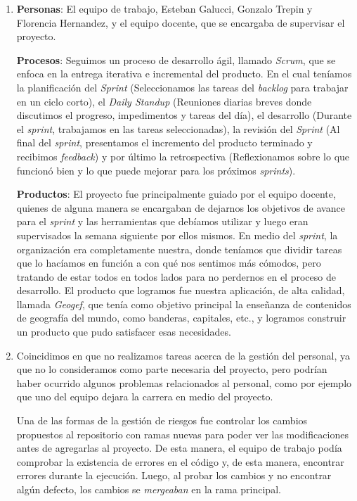 \documentclass{article}
\begin{document}
\begin{enumerate}
    \item
    \textbf{Personas}: El equipo de trabajo, Esteban Galucci, Gonzalo Trepin y Florencia Hernandez, y el equipo docente, que se encargaba de supervisar el proyecto.

    \textbf{Procesos}: Seguimos un proceso de desarrollo ágil, llamado \textit{Scrum}, que se enfoca en la entrega iterativa e incremental del producto. En el cual teníamos la planificación del \textit{Sprint} (Seleccionamos las tareas del \textit{backlog} para trabajar en un ciclo corto), el \textit{Daily Standup} (Reuniones diarias breves donde discutimos el progreso, impedimentos y tareas del día), el desarrollo (Durante el \textit{sprint}, trabajamos en las tareas seleccionadas), la revisión del \textit{Sprint} (Al final del \textit{sprint}, presentamos el incremento del producto terminado y recibimos \textit{feedback}) y por último la retrospectiva (Reflexionamos sobre lo que funcionó bien y lo que puede mejorar para los próximos \textit{sprints}).

    \textbf{Productos}: El proyecto fue principalmente guiado por el equipo docente, quienes de alguna manera se encargaban de dejarnos los objetivos de avance para el \textit{sprint} y las herramientas que debíamos utilizar y luego eran supervisados la semana siguiente por ellos mismos. En medio del \textit{sprint}, la organización era completamente nuestra, donde teníamos que dividir tareas que lo hacíamos en función a con qué nos sentimos más cómodos, pero tratando de estar todos en todos lados para no perdernos en el proceso de desarrollo. El producto que logramos fue nuestra aplicación, de alta calidad, llamada \textit{Geogef}, que tenía como objetivo principal la enseñanza de contenidos de geografía del mundo, como banderas, capitales, etc., y logramos construir un producto que pudo satisfacer esas necesidades.

    \item
    Coincidimos en que no realizamos tareas acerca de la gestión del personal, ya que no lo consideramos como parte necesaria del proyecto, pero podrían haber ocurrido algunos problemas relacionados al personal, como por ejemplo que uno del equipo dejara la carrera en medio del proyecto.

    Una de las formas de la gestión de riesgos fue controlar los cambios propuestos al repositorio con ramas nuevas para poder ver las modificaciones antes de agregarlas al proyecto. De esta manera, el equipo de trabajo podía comprobar la existencia de errores en el código y, de esta manera, encontrar errores durante la ejecución. Luego, al probar los cambios y no encontrar algún defecto, los cambios se \textit{mergeaban} en la rama principal.


\end{enumerate}
\end{document}
